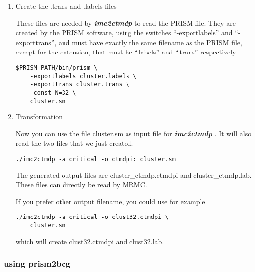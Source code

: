 \documentclass[a4paper,11pt]{scrartcl}
\newcommand{\imcToCtmdp}{\textbf{\textit{imc2ctmdp}} }
\begin{document}
\begin{enumerate}

\item Create the .trans and .labels files

These files are needed by \imcToCtmdp to read the PRISM file. They are created
by the PRISM software, using the switches ``-exportlabels'' and
``-exporttrans'', and must have exactly the same filename as the PRISM file,
except for the extension, that must be ``.labels'' and ``.trans'' respectively.
\begin{verbatim}
$PRISM_PATH/bin/prism \
    -exportlabels cluster.labels \
    -exporttrans cluster.trans \
    -const N=32 \
    cluster.sm
\end{verbatim}

\item Transformation

Now you can use the file cluster.sm as input file for \imcToCtmdp. It will also
read the two files that we just created.
\begin{verbatim}
./imc2ctmdp -a critical -o ctmdpi: cluster.sm
\end{verbatim}
The generated output files are cluster\_ctmdp.ctmdpi and cluster\_ctmdp.lab.
These files can directly be read by MRMC.

If you prefer other output filename, you could use for example
\begin{verbatim}
./imc2ctmdp -a critical -o clust32.ctmdpi \
    cluster.sm
\end{verbatim}
which will create clust32.ctmdpi and clust32.lab.

\end{enumerate}

\subsubsection{using prism2bcg}
\end{document}
